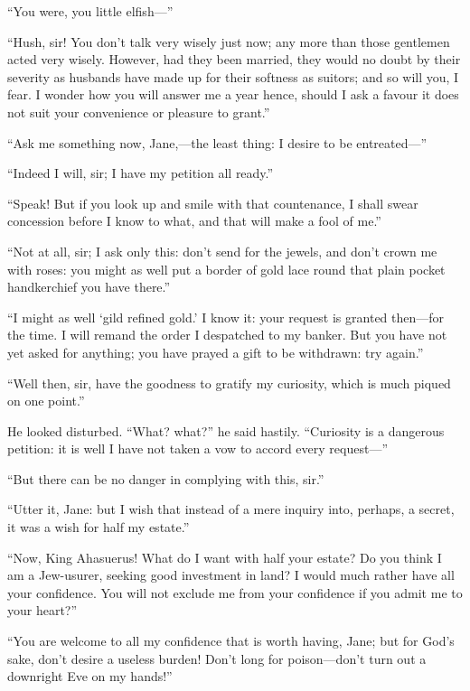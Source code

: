 \enquote{You were, you little elfish---}

\enquote{Hush, sir!  You don't talk very wisely just now; any more than
	those gentlemen acted very wisely.  However, had they been married, they
	would no doubt by their severity as husbands have made up for their
	softness as suitors; and so will you, I fear.  I wonder how you will
	answer me a year hence, should I ask a favour it does not suit your
	convenience or pleasure to grant.}

\enquote{Ask me something now, Jane,---the least thing: I desire to be
	entreated---}

\enquote{Indeed I will, sir; I have my petition all ready.}

\enquote{Speak!  But if you look up and smile with that countenance, I
	shall swear concession before I know to what, and that will make a fool
	of me.}

\enquote{Not at all, sir; I ask only this: don't send for the jewels,
	and don't crown me with roses: you might as well put a border of gold
	lace round that plain pocket handkerchief you have there.}

\enquote{I might as well \enquote{gild refined gold.}  I know it: your
	request is granted then---for the time.  I will remand the order I
	despatched to my banker.  But you have not yet asked for anything; you
	have prayed a gift to be withdrawn: try again.}

\enquote{Well then, sir, have the goodness to gratify my curiosity,
	which is much piqued on one point.}

He looked disturbed.  \enquote{What? what?} he said hastily.
\enquote{Curiosity is a dangerous petition: it is well I have not taken
	a vow to accord every request---}

\enquote{But there can be no danger in complying with this, sir.}

\enquote{Utter it, Jane: but I wish that instead of a mere inquiry into,
	perhaps, a secret, it was a wish for half my estate.}

\enquote{Now, King Ahasuerus!  What do I want with half your estate?  Do
	you think I am a Jew-usurer, seeking good investment in land?  I would
	much rather have all your confidence.  You will not exclude me from your
	confidence if you admit me to your heart?}

\enquote{You are welcome to all my confidence that is worth having,
	Jane; but for God's sake, don't desire a useless burden!  Don't long for
	poison---don't turn out a downright Eve on my hands!}


